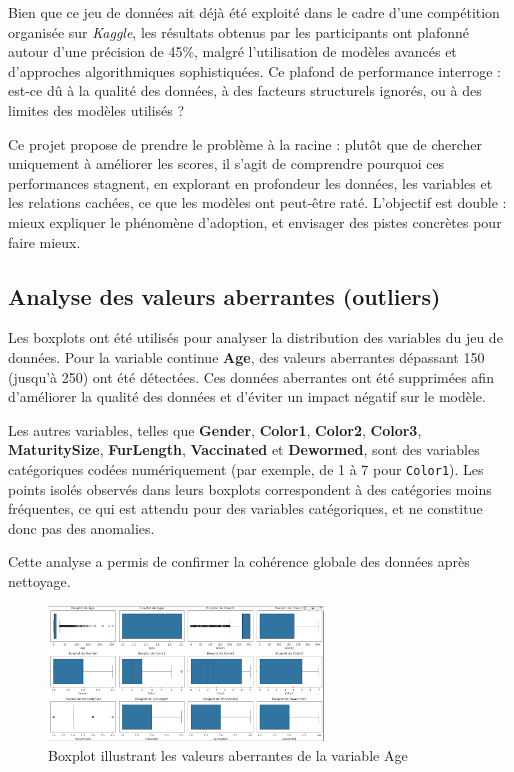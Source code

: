 \documentclass[a4paper,12pt]{article}
\begin{document}
Bien que ce jeu de données ait déjà été exploité dans le cadre d’une compétition organisée sur \textit{Kaggle}, les résultats obtenus par les participants ont plafonné autour d'une précision de 45\%, malgré l’utilisation de modèles avancés et d’approches algorithmiques sophistiquées. Ce plafond de performance interroge : est-ce dû à la qualité des données, à des facteurs structurels ignorés, ou à des limites des modèles utilisés ?

Ce projet propose de prendre le problème à la racine : plutôt que de chercher uniquement à améliorer les scores, il s'agit de comprendre pourquoi ces performances stagnent, en explorant en profondeur les données, les variables et les relations cachées, ce que les modèles ont peut-être raté. L’objectif est double : mieux expliquer le phénomène d’adoption, et envisager des pistes concrètes pour faire mieux.

\subsection{Analyse des valeurs aberrantes (outliers)}

Les boxplots ont été utilisés pour analyser la distribution des variables du jeu de données. Pour la variable continue \textbf{Age}, des valeurs aberrantes dépassant 150 (jusqu'à 250) ont été détectées. Ces données aberrantes ont été supprimées afin d'améliorer la qualité des données et d'éviter un impact négatif sur le modèle.

Les autres variables, telles que \textbf{Gender}, \textbf{Color1}, \textbf{Color2}, \textbf{Color3}, \textbf{MaturitySize}, \textbf{FurLength}, \textbf{Vaccinated} et \textbf{Dewormed}, sont des variables catégoriques codées numériquement (par exemple, de 1 à 7 pour \texttt{Color1}). Les points isolés observés dans leurs boxplots correspondent à des catégories moins fréquentes, ce qui est attendu pour des variables catégoriques, et ne constitue donc pas des anomalies.

Cette analyse a permis de confirmer la cohérence globale des données après nettoyage.

\begin{figure}[H]
    \centering
    \includegraphics[width=0.65\textwidth]{boxplot_age_outliers.png}
    \caption{Boxplot illustrant les valeurs aberrantes de la variable Age}
    \label{fig:outliers_age}
\end{figure}
\end{document}
